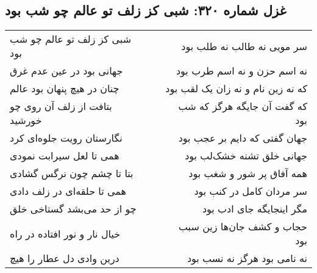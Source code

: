 \begin{center}
\section*{غزل شماره ۳۲۰: شبی کز زلف تو عالم چو شب بود}
\label{sec:320}
\begin{longtable}{l p{0.5cm} r}
شبی کز زلف تو عالم چو شب بود
&&
سر مویی نه طالب نه طلب بود
\\
جهانی بود در عین عدم غرق
&&
نه اسم حزن و نه اسم طرب بود
\\
چنان در هیچ پنهان بود عالم
&&
که نه زین نام و نه زان یک لقب بود
\\
بتافت از زلف آن روی چو خورشید
&&
که گفت آن جایگه هرگز که شب بود
\\
نگارستان رویت جلوه‌ای کرد
&&
جهان گفتی که دایم بر عجب بود
\\
همی تا لعل سیرابت نمودی
&&
جهانی خلق تشنه خشک‌لب بود
\\
بتا تا چشم چون نرگس گشادی
&&
همه آفاق پر شور و شغب بود
\\
همی تا حلقه‌ای در زلف دادی
&&
سر مردان کامل در کنب بود
\\
چو از حد می‌بشد گستاخی خلق
&&
مگر اینجایگه جای ادب بود
\\
خیال نار و نور افتاده در راه
&&
حجاب و کشف جان‌ها زین سبب بود
\\
درین وادی دل عطار را هیچ
&&
نه نامی بود هرگز نه نسب بود
\\
\end{longtable}
\end{center}
